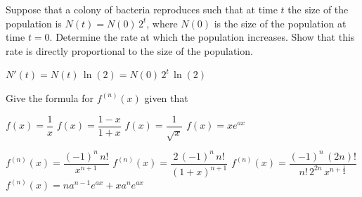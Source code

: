 \ifanalysis\pagebreak\fi

\ifanalysis

\begin{Exercise}[difficulty = 1] Suppose that a colony of bacteria reproduces such that at time $t$ the size of the population is $N(t)=N(0)\,2^t$, where $N(0)$ is the size of the population at time $t=0$. Determine the rate at which the population increases. Show that this rate is directly proportional to the size of the population.

\end{Exercise}

\begin{Answer}\phantom{}
    $N'(t) = N(t)\,\ln(2) = N(0)\,2^t\,\ln(2)$
\end{Answer}

\begin{Exercise} Give the formula for $f^{(n)} (x)$ given that
\begin{multicols}{2}
	\Question[difficulty = 1] $f(x)=\dfrac{1}{x}$
	\Question[difficulty = 1] $f(x)=\dfrac{1-x}{1+x}$
	\Question[difficulty = 2] $f(x)=\dfrac{1}{\sqrt{x}}$
	\Question[difficulty = 1] $f(x) = xe^{ax}$
	\EndCurrentQuestion
\end{multicols}

\end{Exercise}

\begin{Answer}\phantom{}
    \begin{multicols}{2}
    	
    	\Question $f^{(n)} (x)= \dfrac{(-1)^{n}\, n!}{x^{n+1}}$
        \Question $f^{(n)} (x) = \dfrac{2\,(-1)^{n}\, n!}{(1+x)^{n+1}}$
        \Question $f^{(n)} (x) = \dfrac{(-1)^{n}\, (2n)!}{n!\, 2^{2n}\, x^{n+\frac{1}{2}}}$
    	\Question $f^{(n)} (x) = na^{n-1}e^{ax} + x a^n e^{ax}$
    	\EndCurrentQuestion
	\end{multicols}
\end{Answer}
\fi


\subsection*{}

